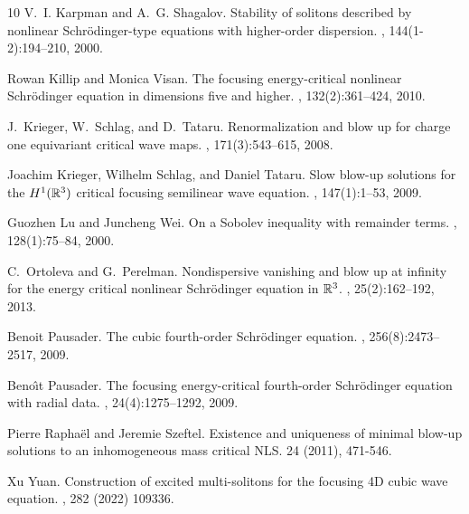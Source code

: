 \documentclass[a4paper,two-side,10pt]{amsart}
\numberwithin{equation}{section}
\begin{document}
\begin{thebibliography}{10}
V.~I. Karpman and A.~G. Shagalov.
\newblock Stability of solitons described by nonlinear {S}chr\"{o}dinger-type
  equations with higher-order dispersion.
, 144(1-2):194--210, 2000.

Rowan Killip and Monica Visan.
\newblock The focusing energy-critical nonlinear {S}chr\"{o}dinger equation in
  dimensions five and higher.
, 132(2):361--424, 2010.

J.~Krieger, W.~Schlag, and D.~Tataru.
\newblock Renormalization and blow up for charge one equivariant critical wave
  maps.
, 171(3):543--615, 2008.

Joachim Krieger, Wilhelm Schlag, and Daniel Tataru.
\newblock Slow blow-up solutions for the {$H^1(\Bbb R^3)$} critical focusing
  semilinear wave equation.
, 147(1):1--53, 2009.

Guozhen Lu and Juncheng Wei.
\newblock On a {S}obolev inequality with remainder terms.
, 128(1):75--84, 2000.

C.~Ortoleva and G.~Perelman.
\newblock Nondispersive vanishing and blow up at infinity for the energy
  critical nonlinear {S}chr\"{o}dinger equation in {$\Bbb R^3$}.
, 25(2):162--192, 2013.

Benoit Pausader.
\newblock The cubic fourth-order {S}chr\"{o}dinger equation.
, 256(8):2473--2517, 2009.

Beno\^{\i}t Pausader.
\newblock The focusing energy-critical fourth-order {S}chr\"{o}dinger equation
  with radial data.
, 24(4):1275--1292, 2009.

Pierre Rapha\" el and Jeremie Szeftel.
 \newblock  Existence and uniqueness of minimal blow-up solutions to an inhomogeneous mass critical NLS.
 24 (2011), 471-546.


Xu Yuan.
\newblock Construction of excited multi-solitons for the focusing 4D cubic wave equation.
, 282 (2022) 109336.

\end{thebibliography}
\end{document}
